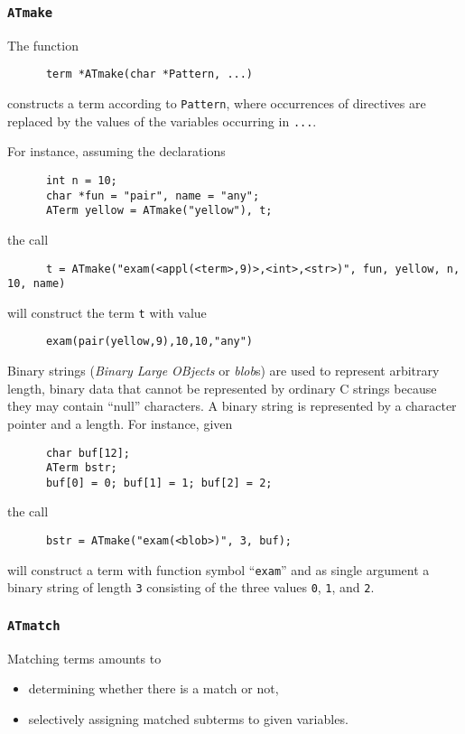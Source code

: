 \documentclass[twoside]{article} %
\begin{document}
\subsubsection{\label{ATmake}{\tt ATmake}}
The function
\begin{verbatim}
      term *ATmake(char *Pattern, ...)
\end{verbatim}
constructs a term according to {\tt Pattern}, where occurrences of
directives are replaced by the values of the variables
occurring in {\tt ...}.

For instance, assuming the declarations
\begin{verbatim}
      int n = 10;
      char *fun = "pair", name = "any";
      ATerm yellow = ATmake("yellow"), t;
\end{verbatim}
the call
\begin{verbatim}
      t = ATmake("exam(<appl(<term>,9)>,<int>,<str>)", fun, yellow, n, 10, name)
\end{verbatim}
will construct the term {\tt t} with value
\begin{verbatim}
      exam(pair(yellow,9),10,10,"any")
\end{verbatim}

Binary strings (\emph{Binary Large OBjects} or \emph{blob\/}s) are used to represent arbitrary length, binary data
that cannot be represented by ordinary C strings because they may
contain ``null'' characters. A binary string is represented by
a character pointer and a length. For instance, given
\begin{verbatim}
      char buf[12];
      ATerm bstr;
      buf[0] = 0; buf[1] = 1; buf[2] = 2;
\end{verbatim}
the call
\begin{verbatim}
      bstr = ATmake("exam(<blob>)", 3, buf);
\end{verbatim}
will construct a term with function symbol ``{\tt exam}'' and as single
argument a binary string of length {\tt 3} consisting of the three
values {\tt 0}, {\tt 1}, and {\tt 2}.

\subsubsection{\label{ATmatch}{\tt ATmatch}}
Matching terms amounts to
\begin{itemize}
\item determining whether there is a match or not,
\item selectively assigning matched subterms to given variables.
\end{itemize}
\end{document}
